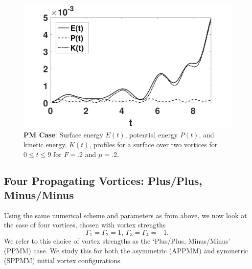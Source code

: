 \documentclass[a4paper,11pt]{article}
\begin{document}
%
\begin{figure}[!h]
\centering
\includegraphics[width=.6\textwidth]{energy_profile_mu_pt2_F_pt2_tv}
\caption{\small {\bf PM Case}: Surface energy $E(t)$, potential energy $P(t)$, and kinetic energy, $K(t)$, profiles for a surface over two vortices for $0\leq t \leq 9$ for $F=.2$ and $\mu=.2$.}
\label{fig:eprof_tv}
\end{figure}

\subsection{Four Propagating Vortices: Plus/Plus, Minus/Minus}
Using the same numerical scheme and parameters as from above, we now look at the case of four vortices, chosen with vortex strengths
\[
\Gamma_{1}=\Gamma_{2}=1, ~ \Gamma_{3}=\Gamma_{4}=-1.
\]
We refer to this choice of vortex strengths as the `Plus/Plus, Minus/Minus' (PPMM) case.  We study this for both the asymmetric (APPMM) and symmetric (SPPMM) initial vortex configurations.  
\end{document}
